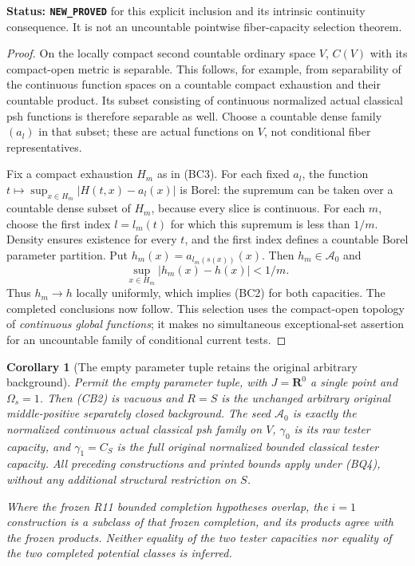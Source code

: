 \documentclass[11pt,a4paper]{article}
\numberwithin{equation}{section}
\newtheorem{corollary}[theorem]{Corollary}
\theoremstyle{definition}
\theoremstyle{remark}
\begin{document}
\noindent\textbf{Status: \texttt{NEW\_PROVED}} for this explicit
inclusion and its intrinsic continuity consequence. It is not an
uncountable pointwise fiber-capacity selection theorem.

\begin{proof}
On the locally compact second countable ordinary space $V$,
$C(V)$ with its compact-open metric is separable. This follows,
for example, from separability of the continuous function spaces
on a countable compact exhaustion and their countable product.
Its subset consisting of continuous normalized actual classical
psh functions is therefore separable as well. Choose a countable
dense family $(a_l)$ in that subset; these are actual functions
on $V$, not conditional fiber representatives.

Fix a compact exhaustion $H_m$ as in (BC3). For each fixed
$a_l$, the function
$t\mapsto\sup_{x\in H_m}|H(t,x)-a_l(x)|$ is Borel:
the supremum can be taken over a countable dense subset of
$H_m$, because every slice is continuous. For each $m$, choose
the first index $l=l_m(t)$ for which this supremum is less than
$1/m$. Density ensures existence for every $t$, and the first
index defines a countable Borel parameter partition. Put
$h_m(x)=a_{l_m(s(x))}(x)$. Then $h_m\in\mathcal A_0$ and
\[
                     \sup_{x\in H_m}|h_m(x)-h(x)|<1/m.
\]
Thus $h_m\to h$ locally uniformly, which implies (BC2) for
both capacities. The completed conclusions now follow. This
selection uses the compact-open topology of \emph{continuous
global functions}; it makes no simultaneous exceptional-set
assertion for an uncountable family of conditional current tests.
\end{proof}

\begin{corollary}[The empty parameter tuple retains the original arbitrary background]
\label{cor:r12-empty-parameter-completion}
Permit the empty parameter tuple, with $J=\mathbf R^0$ a single
point and $\Omega_s=1$. Then (CB2) is vacuous and $R=S$ is
the \emph{unchanged arbitrary original} middle-positive separately
closed background. The seed $\mathcal A_0$ is exactly the
normalized continuous actual classical psh family on $V$,
$\gamma_0$ is its raw tester capacity, and $\gamma_1=C_S$ is
the full original normalized bounded classical tester capacity.
All preceding constructions and printed bounds apply under
(BQ4), without any additional structural restriction on $S$.

Where the frozen R11 bounded completion hypotheses overlap,
the $i=1$ construction is a subclass of that frozen completion,
and its products agree with the frozen products. Neither equality
of the two tester capacities nor equality of the two completed
potential classes is inferred.
\end{corollary}
\end{document}
